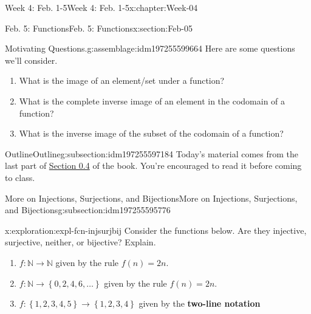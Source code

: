 \documentclass[oneside,10pt,]{book}
\newcommand{\terminology}[1]{\textbf{#1}}
\numberwithin{equation}{section}
\newcommand{\set}[1]{\left\{ {#1} \right\}}
\def\N{{\mathbb N}}
\newcommand{\N}{\mathbb N}
\begin{document}
\begin{chapterptx}{Week 4: Feb. 1-5}{}{Week 4: Feb. 1-5}{}{}{x:chapter:Week-04}
%
%
\typeout{************************************************}
\typeout{************************************************}
%
\begin{sectionptx}{Feb. 5: Functions}{}{Feb. 5: Functions}{}{}{x:section:Feb-05}
\begin{introduction}{}%
\begin{assemblage}{Motivating Questions.}{g:assemblage:idm197255599664}%
Here are some questions we'll consider. %
\begin{enumerate}
\item{}What is the image of an element\slash{}set under a function?%
\item{}What is the complete inverse image of an element in the codomain of a function?%
\item{}What is the inverse image of the subset of the codomain of a function?%
\end{enumerate}
%
\end{assemblage}
\end{introduction}%
%
%
\typeout{************************************************}
\typeout{************************************************}
%
\begin{subsectionptx}{Outline}{}{Outline}{}{}{g:subsection:idm197255597184}
Today's material comes from the last part of \href{http://discrete.openmathbooks.org/dmoi3/sec_intro-functions.html}{Section 0.4} of the book. You're encouraged to read it before coming to class.%
%
%
\typeout{************************************************}
\typeout{************************************************}
%
\begin{subsectionptx}{More on Injections, Surjections, and Bijections}{}{More on Injections, Surjections, and Bijections}{}{}{g:subsection:idm197255595776}
\begin{exploration}{}{x:exploration:expl-fcn-injsurjbij}%
Consider the functions below. Are they injective, surjective, neither, or bijective? Explain.%
%
\begin{enumerate}
\item{}\(f: \N\to \N\) given by the rule \(f(n) = 2n\).%
\item{}\(f: \N\to \set{0,2,4,6,\ldots}\) given by the rule \(f(n) = 2n\).%
\item{}\(f: \set{1,2,3,4,5}\to \set{1,2,3,4}\) given by the \terminology{two-line notation}%
\begin{equation*}

\end{equation*}
\end{enumerate}
\end{exploration}
\end{subsectionptx}
\end{subsectionptx}
\end{sectionptx}
\end{chapterptx}
\end{document}
